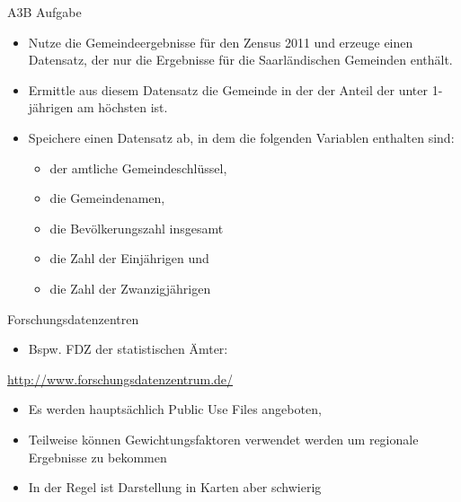 \documentclass[ignorenonframetext,]{beamer}
\providecommand{\tightlist}{%
  \setlength{\itemsep}{0pt}\setlength{\parskip}{0pt}}
\begin{document}
\begin{frame}{A3B Aufgabe}
\protect\hypertarget{a3b-aufgabe}{}

\begin{itemize}
\tightlist
\item
  Nutze die Gemeindeergebnisse für den Zensus 2011 und erzeuge einen
  Datensatz, der nur die Ergebnisse für die Saarländischen Gemeinden
  enthält.
\item
  Ermittle aus diesem Datensatz die Gemeinde in der der Anteil der unter
  1-jährigen am höchsten ist.
\item
  Speichere einen Datensatz ab, in dem die folgenden Variablen enthalten
  sind:

  \begin{itemize}
  \tightlist
  \item
    der amtliche Gemeindeschlüssel,
  \item
    die Gemeindenamen,\\
  \item
    die Bevölkerungszahl insgesamt
  \item
    die Zahl der Einjährigen und
  \item
    die Zahl der Zwanzigjährigen
  \end{itemize}
\end{itemize}

\end{frame}

\begin{frame}{Forschungsdatenzentren}
\protect\hypertarget{forschungsdatenzentren}{}

\begin{itemize}
\tightlist
\item
  Bspw. FDZ der statistischen Ämter:
\end{itemize}

\url{http://www.forschungsdatenzentrum.de/}

\begin{itemize}
\item
  Es werden hauptsächlich Public Use Files angeboten,
\item
  Teilweise können Gewichtungsfaktoren verwendet werden um regionale
  Ergebnisse zu bekommen
\item
  In der Regel ist Darstellung in Karten aber schwierig
\end{itemize}

\end{frame}
\end{document}

